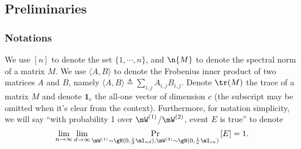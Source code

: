 %





%


\subsection{Preliminaries}

\subsubsection{Notations}

We use $[n]$ to denote the set $\{1,\cdots,n\}$, and $\n{M}$ to denote the spectral norm of a matrix $M$. We use $\langle A, B\rangle$ to denote the Frobenius inner product of two matrices $A$ and $B$, namely $\langle A, B\rangle\triangleq\sum_{i,j}A_{i,j}B_{i,j}$. Denote $\tr(M)$ the trace of a matrix $M$ and denote $\textbf{1}_c$ the all-one vector of dimension $c$ (the subscript may be omitted when it's clear from the context). Furthermore, for notation simplicity, we will say ``with probability 1 over $\mW^{(1)}$/$\mW^{(2)}$, event $E$ is true'' to denote
\begin{equation}
    \lim_{n\to\infty}\lim_{d\to \infty}\mathop{\Pr}_{\mW^{(1)}\sim\gN(0,\frac{1}{d}\mI_{nd}), \mW^{(2)}\sim\gN(0,\frac{1}{n}\mI_{cn})}\left[E\right] = 1.
\end{equation}

